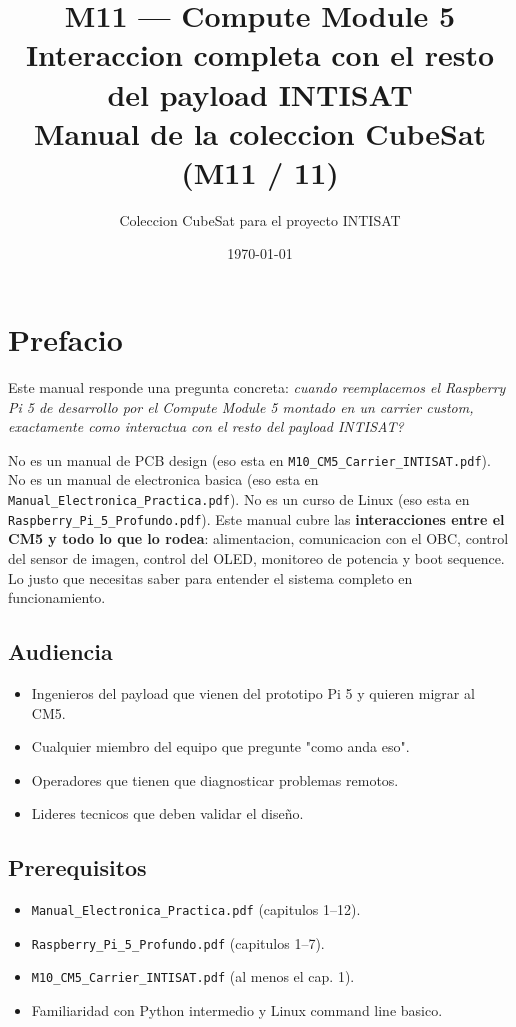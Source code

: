 \documentclass[11pt,a4paper,oneside,openright]{book}
\title{\Huge\bfseries M11 --- Compute Module 5\\[0.4em]
\Large Interaccion completa con el resto del payload INTISAT\\[0.6em]
\large Manual de la coleccion CubeSat (M11 / 11)}
\author{Coleccion CubeSat para el proyecto INTISAT}
\date{\today}
\begin{document}
\frontmatter
\maketitle

\chapter*{Prefacio}

Este manual responde una pregunta concreta: \emph{cuando reemplacemos el
Raspberry Pi 5 de desarrollo por el Compute Module 5 montado en un carrier
custom, exactamente como interactua con el resto del payload INTISAT?}

No es un manual de PCB design (eso esta en \texttt{M10\_CM5\_Carrier\_INTISAT.pdf}).
No es un manual de electronica basica (eso esta en
\texttt{Manual\_Electronica\_Practica.pdf}). No es un curso de Linux
(eso esta en \texttt{Raspberry\_Pi\_5\_Profundo.pdf}). Este manual cubre las
\textbf{interacciones entre el CM5 y todo lo que lo rodea}: alimentacion,
comunicacion con el OBC, control del sensor de imagen, control del OLED,
monitoreo de potencia y boot sequence. Lo justo que necesitas saber para
entender el sistema completo en funcionamiento.

\section*{Audiencia}

\begin{itemize}[leftmargin=2em]
  \item Ingenieros del payload que vienen del prototipo Pi 5 y quieren
        migrar al CM5.
  \item Cualquier miembro del equipo que pregunte "como anda eso".
  \item Operadores que tienen que diagnosticar problemas remotos.
  \item Lideres tecnicos que deben validar el diseño.
\end{itemize}

\section*{Prerequisitos}

\begin{itemize}[leftmargin=2em]
  \item \texttt{Manual\_Electronica\_Practica.pdf} (capitulos 1--12).
  \item \texttt{Raspberry\_Pi\_5\_Profundo.pdf} (capitulos 1--7).
  \item \texttt{M10\_CM5\_Carrier\_INTISAT.pdf} (al menos el cap. 1).
  \item Familiaridad con Python intermedio y Linux command line basico.
\end{itemize}
\end{document}
